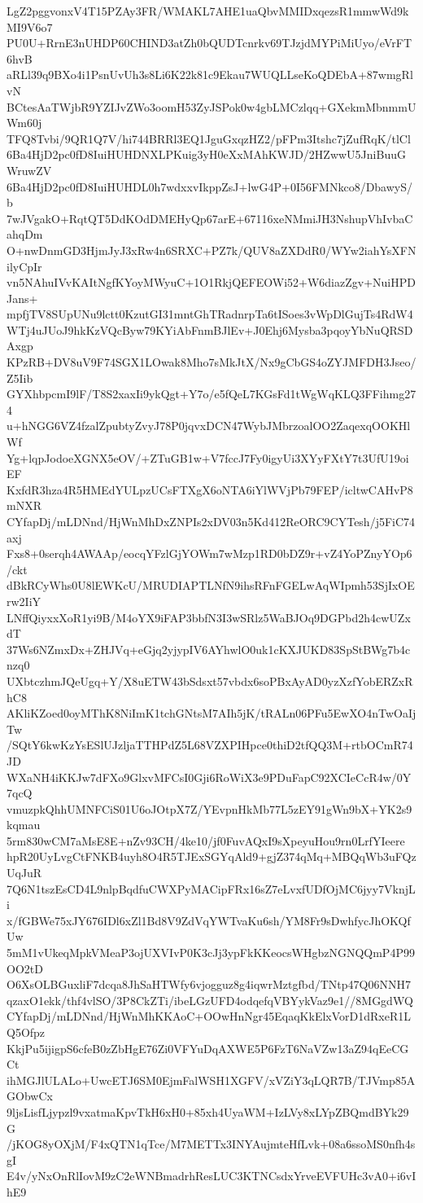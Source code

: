LgZ2pggvonxV4T15PZAy3FR/WMAKL7AHE1uaQbvMMIDxqezsR1mmwWd9kMI9V6o7
PU0U+RrnE3nUHDP60CHIND3atZh0bQUDTcnrkv69TJzjdMYPiMiUyo/eVrFT6hvB
aRLl39q9BXo4i1PsnUvUh3s8Li6K22k81c9Ekau7WUQLLseKoQDEbA+87wmgRlvN
BCtesAaTWjbR9YZIJvZWo3oomH53ZyJSPok0w4gbLMCzlqq+GXekmMbnmmUWm60j
TFQ8Tvbi/9QR1Q7V/hi744BRRl3EQ1JguGxqzHZ2/pFPm3Itshc7jZufRqK/tlCl
6Ba4HjD2pc0fD8IuiHUHDNXLPKuig3yH0eXxMAhKWJD/2HZwwU5JniBuuGWruwZV
6Ba4HjD2pc0fD8IuiHUHDL0h7wdxxvIkppZsJ+lwG4P+0I56FMNkco8/DbawyS/b
7wJVgakO+RqtQT5DdKOdDMEHyQp67arE+67116xeNMmiJH3NshupVhIvbaCahqDm
O+nwDnmGD3HjmJyJ3xRw4n6SRXC+PZ7k/QUV8aZXDdR0/WYw2iahYsXFNilyCpIr
vn5NAhuIVvKAItNgfKYoyMWyuC+1O1RkjQEFEOWi52+W6diazZgv+NuiHPDJans+
mpfjTV8SUpUNu9lctt0KzutGI31mntGhTRadnrpTa6tISoes3vWpDlGujTs4RdW4
WTj4uJUoJ9hkKzVQcByw79KYiAbFnmBJlEv+J0Ehj6Mysba3pqoyYbNuQRSDAxgp
KPzRB+DV8uV9F74SGX1LOwak8Mho7sMkJtX/Nx9gCbGS4oZYJMFDH3Jseo/Z5Iib
GYXhbpcmI9lF/T8S2xaxIi9ykQgt+Y7o/e5fQeL7KGsFd1tWgWqKLQ3FFihmg274
u+hNGG6VZ4fzalZpubtyZvyJ78P0jqvxDCN47WybJMbrzoalOO2ZaqexqOOKHlWf
Yg+lqpJodoeXGNX5eOV/+ZTuGB1w+V7fccJ7Fy0igyUi3XYyFXtY7t3UfU19oiEF
KxfdR3hza4R5HMEdYULpzUCsFTXgX6oNTA6iYlWVjPb79FEP/icltwCAHvP8mNXR
CYfapDj/mLDNnd/HjWnMhDxZNPIs2xDV03n5Kd412ReORC9CYTesh/j5FiC74axj
Fxs8+0serqh4AWAAp/eocqYFzlGjYOWm7wMzp1RD0bDZ9r+vZ4YoPZnyYOp6/ckt
dBkRCyWhs0U8lEWKcU/MRUDIAPTLNfN9ihsRFnFGELwAqWIpmh53SjIxOErw2IiY
LNffQiyxxXoR1yi9B/M4oYX9iFAP3bbfN3I3wSRlz5WaBJOq9DGPbd2h4cwUZxdT
37Ws6NZmxDx+ZHJVq+eGjq2yjypIV6AYhwlO0uk1cKXJUKD83SpStBWg7b4cnzq0
UXbtczhmJQeUgq+Y/X8uETW43bSdsxt57vbdx6soPBxAyAD0yzXzfYobERZxRhC8
AKliKZoed0oyMThK8NiImK1tchGNtsM7AIh5jK/tRALn06PFu5EwXO4nTwOaIjTw
/SQtY6kwKzYsESlUJzljaTTHPdZ5L68VZXPIHpce0thiD2tfQQ3M+rtbOCmR74JD
WXaNH4iKKJw7dFXo9GlxvMFCsI0Gji6RoWiX3e9PDuFapC92XCIeCcR4w/0Y7qcQ
vmuzpkQhhUMNFCiS01U6oJOtpX7Z/YEvpnHkMb77L5zEY91gWn9bX+YK2s9kqmau
5rm830wCM7aMsE8E+nZv93CH/4ke10/jf0FuvAQxI9sXpeyuHou9rn0LrfYIeere
hpR20UyLvgCtFNKB4uyh8O4R5TJExSGYqAld9+gjZ374qMq+MBQqWb3uFQzUqJuR
7Q6N1tszEsCD4L9nlpBqdfuCWXPyMACipFRx16sZ7eLvxfUDfOjMC6jyy7VknjLi
x/fGBWe75xJY676IDl6xZl1Bd8V9ZdVqYWTvaKu6sh/YM8Fr9sDwhfycJhOKQfUw
5mM1vUkeqMpkVMeaP3ojUXVIvP0K3cJj3ypFkKKeocsWHgbzNGNQQmP4P99OO2tD
O6XsOLBGuxliF7dcqa8JhSaHTWfy6vjogguz8g4iqwrMztgfbd/TNtp47Q06NNH7
qzaxO1ekk/thf4vlSO/3P8CkZTi/ibeLGzUFD4odqefqVBYykVaz9e1//8MGgdWQ
CYfapDj/mLDNnd/HjWnMhKKAoC+OOwHnNgr45EqaqKkElxVorD1dRxeR1LQ5Ofpz
KkjPu5ijigpS6cfeB0zZbHgE76Zi0VFYuDqAXWE5P6FzT6NaVZw13aZ94qEeCGCt
ihMGJlULALo+UwcETJ6SM0EjmFalWSH1XGFV/xVZiY3qLQR7B/TJVmp85AGObwCx
9ljsLisfLjypzl9vxatmaKpvTkH6xH0+85xh4UyaWM+IzLVy8xLYpZBQmdBYk29G
/jKOG8yOXjM/F4xQTN1qTce/M7METTx3INYAujmteHfLvk+08a6ssoMS0nfh4sgI
E4v/yNxOnRlIovM9zC2eWNBmadrhResLUC3KTNCsdxYrveEVFUHc3vA0+i6vIhE9

